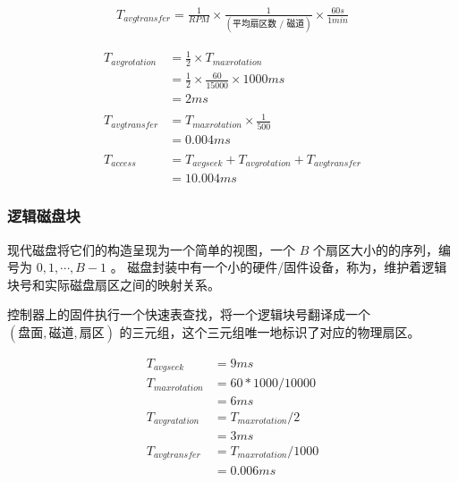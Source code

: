 {{{\begin{description}
{                    \begin{align*}
                        T_{avg transfer} = \frac{1}{RPM} \times \frac{1}{(\text{平均扇区数 / 磁道})} \times \frac{60s}{1min}
                    \end{align*}
                }
            \end{description}

            \begin{practicec}
                \begin{align*}
                    T_{avg rotation}
                    &= \frac{1}{2} \times T_{max rotation} \\
                    &= \frac{1}{2} \times \frac{60}{15000} \times 1000ms \\
                    &= 2ms \\
                    \\
                    T_{avg transfer}
                    &= T_{max rotation} \times \frac{1}{500} \\
                    &= 0.004ms \\
                    \\
                    T_{access}
                    &= T_{avg seek} + T_{avg rotation} + T_{avg transfer} \\
                    &= 10.004ms
                \end{align*}
            \end{practicec}
        }

        \subsubsection{逻辑磁盘块}
        {
            现代磁盘将它们的构造呈现为一个简单的视图，一个 $B$ 个扇区大小的的序列，编号为 $0, 1, \cdots, B - 1$ 。
            磁盘封装中有一个小的硬件/固件设备，称为，维护着逻辑块号和实际磁盘扇区之间的映射关系。

            控制器上的固件执行一个快速表查找，将一个逻辑块号翻译成一个 $(\text{盘面}, \text{磁道}, \text{扇区})$ 的三元组，这个三元组唯一地标识了对应的物理扇区。

            \begin{practicec}
                \begin{align*}
                    T_{avg seek} &= 9ms \\
                    T_{max rotation} &= 60 * 1000 / 10000 \\
                    &= 6ms \\
                    T_{avg ratation} &= T_{max rotation} / 2 \\
                    &= 3ms \\
                    T_{avg transfer} &= T_{max rotation} / 1000 \\
                    &= 0.006ms
                \end{align*}


\end{practicec}}}}
